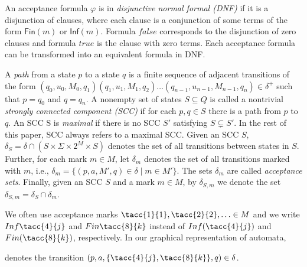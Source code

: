 \documentclass[a4paper,UKenglish,cleveref, autoref, thm-restate]{lipics-v2021}
\def\Inf{\ensuremath{\mathsf{Inf}}}
\def\Fin{\ensuremath{\mathsf{Fin}}}
\def\false{\mathit{false}}
\def\true{\mathit{true}}
\begin{document}
An acceptance formula $\varphi$ is in \emph{disjunctive normal formal
  (DNF)} if it is a disjunction of clauses, where each clause is a
conjunction of some terms of the form $\Fin(m)$ or $\Inf(m)$.  Formula
$\false$ corresponds to the disjunction of zero clauses and formula
$\true$ is the clause with zero terms. Each acceptance formula can be
transformed into an equivalent formula in DNF.

A \emph{path} from a state $p$ to a state $q$ is a finite sequence of
adjacent transitions of the form
$(q_0,u_0,M_0,q_1)(q_1,u_1,M_1,q_2)\dots(q_{n-1},u_{n-1},M_{n-1},q_n)\in\delta^+$
such that $p=q_0$ and $q=q_n$. A nonempty set of states $S\subseteq Q$
is called a nontrivial \emph{strongly connected component (SCC)} if
for each $p,q\in S$ there is a path from $p$ to $q$. An SCC S is
\emph{maximal} if there is no SCC $S'$ satisfying $S\subsetneq S'$. In
the rest of this paper, SCC always refers to a maximal SCC. Given an
SCC $S$, $\delta_S=\delta\cap (S\times \Sigma \times 2^M \times S)$
denotes the set of all transitions between states in $S$. Further, for
each mark $m\in M$, let $\delta_m$ denotes the set of all transitions
marked with $m$, i.e., $\delta_m=\{(p,a,M',q)\in\delta\mid m\in
M'\}$. The sets $\delta_m$ are called \emph{acceptance sets}.
Finally, given an SCC $S$ and a mark $m\in M$, by $\delta_{S,m}$ we
denote the set $\delta_{S,m}=\delta_S\cap\delta_m$.

We often use acceptance marks $\tacc{1}{1},\tacc{2}{2},\ldots\in M$
and we write $\Inf\tacc{4}{j}$ and $\Fin\tacc{8}{k}$ instead of
$\Inf(\tacc{4}{j})$ and $\Fin(\tacc{8}{k})$, respectively. In our
graphical representation of automata,
denotes the transition $(p,a,\{\tacc{4}{j},\tacc{8}{k}\},q)\in\delta$.


\bigskip
\end{document}
